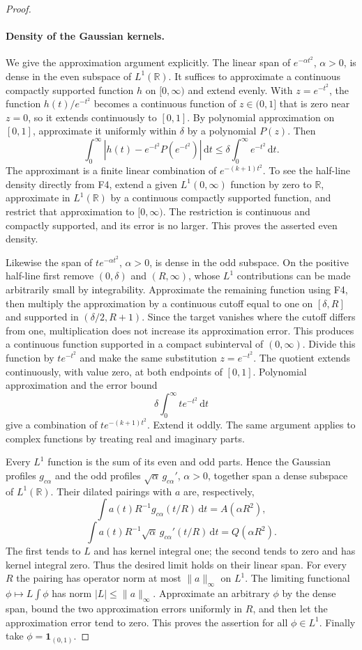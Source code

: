 \documentclass[11pt]{article}
\theoremstyle{remark}\newtheorem{remark}[theorem]{Remark}
\newcommand{\R}{\mathbb R}\newcommand{\C}{\mathbb C}
\newcommand{\dd}{\,\mathrm d}\newcommand{\tr}{\operatorname{tr}}
\newcommand{\one}{\mathbf1}
\begin{document}
\begin{proof}
\paragraph{Density of the Gaussian kernels.}
We give the approximation argument explicitly. The linear span of $e^{-\alpha t^2}$, $\alpha>0$, is dense in the even subspace of $L^1(\R)$. It suffices to approximate a continuous compactly supported function $h$ on $[0,\infty)$ and extend evenly. With $z=e^{-t^2}$, the function $h(t)/e^{-t^2}$ becomes a continuous function of $z\in(0,1]$ that is zero near $z=0$, so it extends continuously to $[0,1]$. By polynomial approximation on $[0,1]$, approximate it uniformly within $\delta$ by a polynomial $P(z)$. Then
\[
 \int_0^\infty|h(t)-e^{-t^2}P(e^{-t^2})|\dd t
 \leq\delta\int_0^\infty e^{-t^2}\dd t.
\]
The approximant is a finite linear combination of $e^{-(k+1)t^2}$. To see the half-line density directly from F4, extend a given $L^1(0,\infty)$ function by zero to $\R$, approximate in $L^1(\R)$ by a continuous compactly supported function, and restrict that approximation to $[0,\infty)$. The restriction is continuous and compactly supported, and its error is no larger. This proves the asserted even density.

Likewise the span of $t e^{-\alpha t^2}$, $\alpha>0$, is dense in the odd subspace. On the positive half-line first remove $(0,\delta)$ and $(R,\infty)$, whose $L^1$ contributions can be made arbitrarily small by integrability. Approximate the remaining function using F4, then multiply the approximation by a continuous cutoff equal to one on $[\delta,R]$ and supported in $(\delta/2,R+1)$. Since the target vanishes where the cutoff differs from one, multiplication does not increase its approximation error. This produces a continuous function supported in a compact subinterval of $(0,\infty)$. Divide this function by $te^{-t^2}$ and make the same substitution $z=e^{-t^2}$. The quotient extends continuously, with value zero, at both endpoints of $[0,1]$. Polynomial approximation and the error bound
\[
 \delta\int_0^\infty te^{-t^2}\dd t
\]
give a combination of $t e^{-(k+1)t^2}$. Extend it oddly. The same argument applies to complex functions by treating real and imaginary parts.

Every $L^1$ function is the sum of its even and odd parts. Hence the Gaussian profiles $g_{c\alpha}$ and the odd profiles $\sqrt\alpha\,g_{c\alpha}'$, $\alpha>0$, together span a dense subspace of $L^1(\R)$. Their dilated pairings with $a$ are, respectively,
\[
 \int a(t)R^{-1}g_{c\alpha}(t/R)\dd t=A(\alpha R^2),
\]
\[
 \int a(t)R^{-1}\sqrt\alpha\,g_{c\alpha}'(t/R)\dd t=Q(\alpha R^2).
\]
The first tends to $L$ and has kernel integral one; the second tends to zero and has kernel integral zero. Thus the desired limit holds on their linear span. For every $R$ the pairing has operator norm at most $\|a\|_\infty$ on $L^1$. The limiting functional $\phi\mapsto L\int\phi$ has norm $|L|\leq\|a\|_\infty$. Approximate an arbitrary $\phi$ by the dense span, bound the two approximation errors uniformly in $R$, and then let the approximation error tend to zero. This proves the assertion for all $\phi\in L^1$. Finally take $\phi=\one_{(0,1)}$.
\end{proof}
\end{document}
